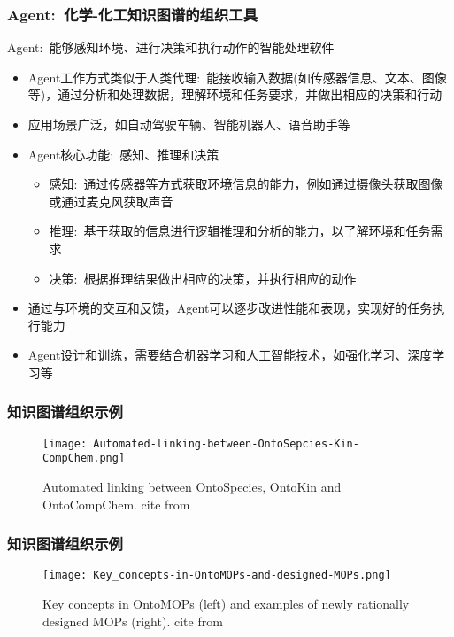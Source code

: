 \frame
{
	\frametitle{\textrm{Agent}:~化学-化工知识图谱的组织工具}
	\textrm{Agent}:~能够感知环境、进行决策和执行动作的智能处理软件
	\begin{itemize}
		\item \textrm{Agent}工作方式类似于人类代理:~能接收输入数据(如传感器信息、文本、图像等)，通过分析和处理数据，理解环境和任务要求，并做出相应的决策和行动
		\item 应用场景广泛，如自动驾驶车辆、智能机器人、语音助手等
		\item \textrm{Agent}核心功能:~感知、推理和决策
			\begin{itemize}
				\item 感知:~通过传感器等方式获取环境信息的能力，例如通过摄像头获取图像或通过麦克风获取声音
				\item 推理:~基于获取的信息进行逻辑推理和分析的能力，以了解环境和任务需求
				\item 决策:~根据推理结果做出相应的决策，并执行相应的动作
			\end{itemize}
		\item 通过与环境的交互和反馈，\textrm{Agent}可以逐步改进性能和表现，实现好的任务执行能力\\
		\item \textrm{Agent}设计和训练，需要结合机器学习和人工智能技术，如强化学习、深度学习等
	\end{itemize}
}

\frame
{
	\frametitle{知识图谱组织示例}
\begin{figure}[h!]
\centering
\vskip -8pt
\texttt{[image: Automated-linking-between-OntoSepcies-Kin-CompChem.png]}
\caption{\tiny\textrm{Automated linking between OntoSpecies, OntoKin and OntoCompChem. cite from\cite{ACR56-128_2023}}}%
\label{Fig:Automated-linking-between-OntoSpecies-Kin-CompChem}
\end{figure}
}

\frame
{
	\frametitle{知识图谱组织示例}
\begin{figure}[h!]
\centering
\vskip -8pt
\texttt{[image: Key\_concepts-in-OntoMOPs-and-designed-MOPs.png]}
\caption{\tiny\textrm{Key concepts in OntoMOPs (left) and examples of newly rationally designed MOPs (right). cite from\cite{ACR56-128_2023}}}%
\label{Fig:OntoMOPs-MOPs}
\end{figure}
}

